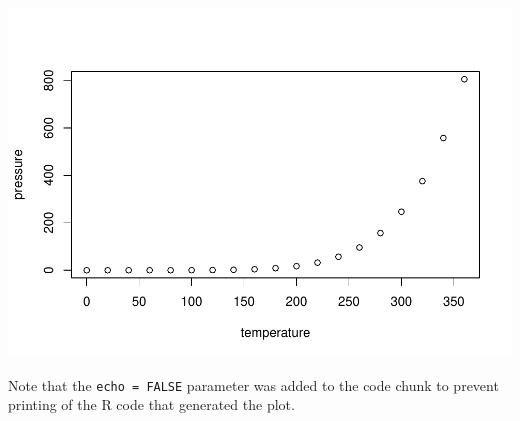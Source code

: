 \documentclass[
]{book}
\begin{document}
\includegraphics{t_files/figure-latex/pressure-1.pdf}

Note that the \texttt{echo\ =\ FALSE} parameter was added to the code chunk to prevent printing of the R code that generated the plot.

  
\end{document}
